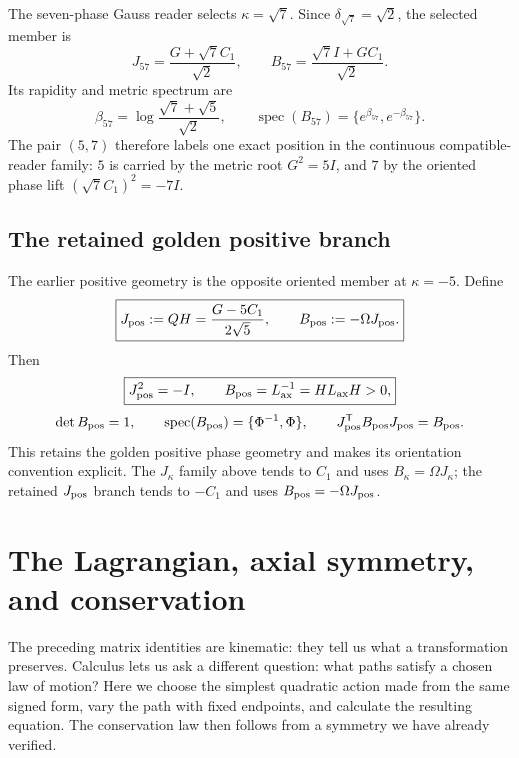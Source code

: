 \documentclass[10pt]{article}
\begin{document}
The seven-phase Gauss reader selects $\kappa=\sqrt7$. Since
$\delta_{\sqrt7}=\sqrt2$, the selected member is
\begin{equation}
\boxed{J_{57}=\frac{G+\sqrt7C_1}{\sqrt2},\qquad
B_{57}=\frac{\sqrt7I+GC_1}{\sqrt2}.}
\end{equation}
Its rapidity and metric spectrum are
\begin{equation}
\boxed{\beta_{57}=\log\frac{\sqrt7+\sqrt5}{\sqrt2},\qquad
\operatorname{spec}(B_{57})=\{e^{\beta_{57}},e^{-\beta_{57}}\}.}
\end{equation}
The pair $(5,7)$ therefore labels one exact position in the continuous compatible-reader family: $5$ is carried by the metric root $G^2=5I$, and $7$ by the oriented phase lift $(\sqrt7C_1)^2=-7I$.

\subsection*{The retained golden positive branch}
The earlier positive geometry is the opposite oriented member at $\kappa=-5$. Define
\begin{equation}
\boxed{J_{\rm pos}:=QH=\frac{G-5C_1}{2\sqrt5},\qquad
B_{\rm pos}:=-\Omega J_{\rm pos}.}
\end{equation}
Then
\begin{equation}
\boxed{J_{\rm pos}^2=-I,\qquad
B_{\rm pos}=L_{\rm ax}^{-1}=HL_{\rm ax}H>0,}
\end{equation}
\begin{equation}
\det B_{\rm pos}=1,\qquad
\operatorname{spec}(B_{\rm pos})=\{\Phi^{-1},\Phi\},\qquad
J_{\rm pos}^{\mathsf T}B_{\rm pos}J_{\rm pos}=B_{\rm pos}.
\end{equation}
This retains the golden positive phase geometry and makes its orientation convention explicit. The $J_\kappa$ family above tends to $C_1$ and uses $B_\kappa=\Omega J_\kappa$; the retained $J_{\rm pos}$ branch tends to $-C_1$ and uses $B_{\rm pos}=-\Omega J_{\rm pos}$.

\section{The Lagrangian, axial symmetry, and conservation}\label{sec:lagr}
The preceding matrix identities are kinematic: they tell us what a transformation preserves. Calculus lets us ask a different question: what paths satisfy a chosen law of motion? Here we choose the simplest quadratic action made from the same signed form, vary the path with fixed endpoints, and calculate the resulting equation. The conservation law then follows from a symmetry we have already verified.
\end{document}
